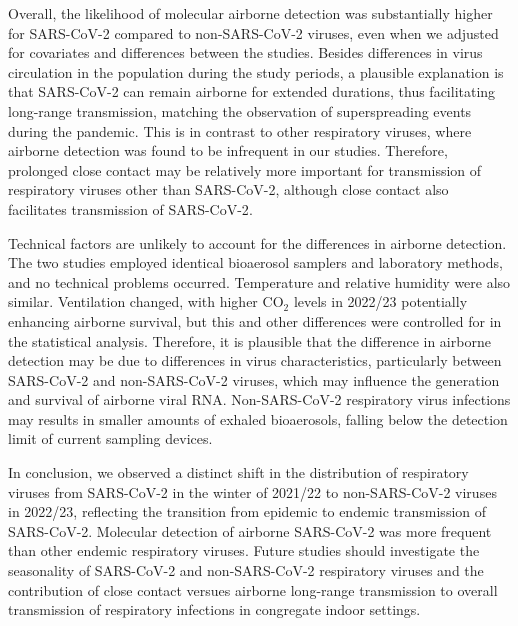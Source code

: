 \documentclass[fleqn,11pt]{wlscirep}
\begin{document}
Overall, the likelihood of molecular airborne detection was substantially higher for SARS-CoV-2 compared to non-SARS-CoV-2 viruses, even when we adjusted for covariates and differences between the studies. Besides differences in virus circulation in the population during the study periods, a plausible explanation is that SARS-CoV-2 can remain airborne for extended durations, thus facilitating long-range transmission, matching the observation of superspreading events during the pandemic. This is in contrast to other respiratory viruses, where airborne detection was found to be infrequent in our studies. Therefore, prolonged close contact may be relatively more important for transmission of respiratory viruses other than SARS-CoV-2, although close contact also facilitates transmission of SARS-CoV-2\cite{Leung2020NatMed,Lind2023NatCommun}.

Technical factors are unlikely to account for the differences in airborne detection. The two studies employed identical bioaerosol samplers and laboratory methods, and no technical problems occurred. Temperature and relative humidity were also similar. Ventilation changed, with higher CO$_2$ levels in 2022/23 potentially enhancing airborne survival, but this and other differences were controlled for in the statistical analysis. Therefore, it is plausible that the difference in airborne detection may be due to differences in virus characteristics, particularly between SARS-CoV-2 and non-SARS-CoV-2 viruses, which may influence the generation and survival of airborne viral RNA\cite{Wang2021}. Non-SARS-CoV-2 respiratory virus infections may results in smaller amounts of exhaled bioaerosols, falling below the detection limit of current sampling devices\cite{Belser2023PLOSPath}. 

In conclusion, we observed a distinct shift in the distribution of respiratory viruses from SARS-CoV-2 in the winter of 2021/22 to non-SARS-CoV-2 viruses in 2022/23, reflecting the transition from epidemic to endemic transmission of SARS-CoV-2. Molecular detection of airborne SARS-CoV-2 was more frequent than other endemic respiratory viruses. Future studies should investigate the seasonality of SARS-CoV-2 and non-SARS-CoV-2 respiratory viruses and the contribution of close contact versues airborne long-range transmission to overall transmission of respiratory infections in congregate indoor settings.   



\end{document}
